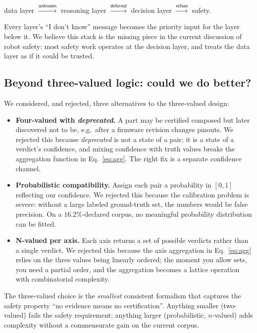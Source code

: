 \documentclass[review]{elsarticle}
\begin{document}
\begin{center}
data layer $\xrightarrow{\mathsf{unknown}}$
reasoning layer $\xrightarrow{\mathsf{deferred}}$
decision layer $\xrightarrow{\mathsf{refuse}}$
safety.
\end{center}

Every layer's ``I don't know'' message becomes the priority input
for the layer below it. We believe this stack is the missing piece
in the current discussion of robot safety: most safety work
operates at the decision layer, and treats the data layer as if
it could be trusted.

\subsection{Beyond three-valued logic: could we do better?}

We considered, and rejected, three alternatives to the three-valued
design:

\begin{itemize}[nosep,leftmargin=*]
\item \textbf{Four-valued with \emph{deprecated}.} A part may
be certified composed but later discovered not to be, e.g.\ after
a firmware revision changes pinouts. We rejected this because
\emph{deprecated} is not a state of a pair; it is a state of a
verdict's confidence, and mixing confidence with truth values
breaks the aggregation function in Eq.~\eqref{eq:agg}. The right
fix is a separate confidence channel.

\item \textbf{Probabilistic compatibility.} Assign each pair a
probability in $[0, 1]$ reflecting our confidence. We rejected
this because the calibration problem is severe: without a large
labeled ground-truth set, the numbers would be false precision.
On a $16.2\%$-declared corpus, no meaningful probability
distribution can be fitted.

\item \textbf{N-valued per axis.} Each axis returns a set of
possible verdicts rather than a single verdict. We rejected this
because the axis aggregation in Eq.~\eqref{eq:agg} relies on the
three values being linearly ordered; the moment you allow sets,
you need a partial order, and the aggregation becomes a lattice
operation with combinatorial complexity.
\end{itemize}

The three-valued choice is the \emph{smallest} consistent formalism
that captures the safety property ``no evidence means no
certification''. Anything smaller (two-valued) fails the safety
requirement; anything larger (probabilistic, $n$-valued) adds
complexity without a commensurate gain on the current corpus.
\end{document}
